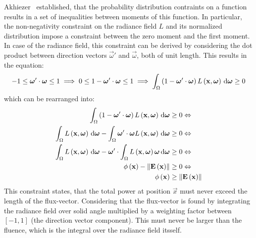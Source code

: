 Akhiezer~\cite{Akhiezer65} established, that the probability distribution contraints on a function results in a set of inequalities between moments of this function. In particular, the non-negativity constraint on the radiance field $L$ and its normalized distribution impose a constraint between the zero moment and the first moment. In case of the radiance field, this constraint can be derived by considering the dot product between direction vectors $\vec{\omega}'$ and $\vec{\omega}$, both of unit length. This results in the equation:
\begin{align*}
-1 \le \boldsymbol{\mathbf{\omega}}'\cdot\boldsymbol{\mathbf{\omega}} \le 1
\implies
0 \le 1 - \boldsymbol{\mathbf{\omega}}'\cdot\boldsymbol{\mathbf{\omega}} \le 1
\implies
\int_{\Omega}{\left(1-\boldsymbol{\mathbf{\omega}}'\cdot\boldsymbol{\mathbf{\omega}}\right)L\left(\boldsymbol{\mathbf{x}}, \boldsymbol{\mathbf{\omega}}\right)\,\mathrm{d}\boldsymbol{\mathbf{\omega}}}\ge 0
\end{align*}
which can be rearranged into:
\begin{align*}
\int_{\Omega}{\left(1-\boldsymbol{\mathbf{\omega}}'\cdot\boldsymbol{\mathbf{\omega}}\right)L\left(\boldsymbol{\mathbf{x}}, \boldsymbol{\mathbf{\omega}}\right)\,\mathrm{d}\boldsymbol{\mathbf{\omega}}} &\ge 0
\Leftrightarrow
\\
\int_{\Omega}{L\left(\boldsymbol{\mathbf{x}}, \boldsymbol{\mathbf{\omega}}\right)\,\mathrm{d}\boldsymbol{\mathbf{\omega}}}
-\int_{\Omega}{\boldsymbol{\mathbf{\omega}}'\cdot\boldsymbol{\mathbf{\omega}} L\left(\boldsymbol{\mathbf{x}}, \boldsymbol{\mathbf{\omega}}\right)\,\mathrm{d}\boldsymbol{\mathbf{\omega}}}
&\ge 0
\Leftrightarrow
\\
\int_{\Omega}{L\left(\boldsymbol{\mathbf{x}}, \boldsymbol{\mathbf{\omega}}\right)\,\mathrm{d}\boldsymbol{\mathbf{\omega}}}
-\boldsymbol{\mathbf{\omega}}'\cdot\int_{\Omega}{L\left(\boldsymbol{\mathbf{x}}, \boldsymbol{\mathbf{\omega}}\right)\boldsymbol{\mathbf{\omega}}\,\mathrm{d}\boldsymbol{\mathbf{\omega}}}
&\ge 0
\Leftrightarrow
\\
\phi\left(\boldsymbol{\mathbf{x}}\right)
-\left\lVert\boldsymbol{\mathbf{E}}\left(\boldsymbol{\mathbf{x}}\right)\right\rVert
&\ge 0
\Leftrightarrow
\\
\phi\left(\boldsymbol{\mathbf{x}}\right)
&\ge \left\lVert\boldsymbol{\mathbf{E}}\left(\boldsymbol{\mathbf{x}}\right)\right\rVert
\end{align*}
This constraint states, that the total power at position $\vec{x}$ must never exceed the length of the flux-vector. Considering that the flux-vector is found by integrating the radiance field over solid angle multiplied by a weighting factor between $\left[-1, 1\right]$ (the direction vector component). This must never be larger than the fluence, which is the integral over the radiance field itsself.

